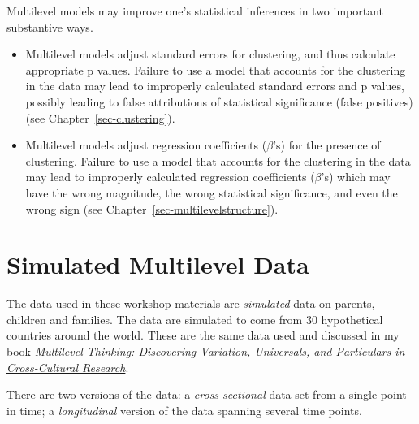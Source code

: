 \documentclass[
  letterpaper,
  DIV=11,
  numbers=noendperiod]{scrreprt}
\providecommand{\tightlist}{%
  \setlength{\itemsep}{0pt}\setlength{\parskip}{0pt}}
\begin{document}
\begin{tcolorbox}[enhanced jigsaw, arc=.35mm, bottomrule=.15mm, bottomtitle=1mm, breakable, colback=white, colbacktitle=quarto-callout-tip-color!10!white, colframe=quarto-callout-tip-color-frame, coltitle=black, left=2mm, leftrule=.75mm, opacityback=0, opacitybacktitle=0.6, rightrule=.15mm, title=\textcolor{quarto-callout-tip-color}{\faLightbulb}\hspace{0.5em}{The Importance of Multilevel Models}, titlerule=0mm, toprule=.15mm, toptitle=1mm]

Multilevel models may improve one's statistical inferences in two
important substantive ways.

\begin{itemize}
\tightlist
\item
  Multilevel models adjust standard errors for clustering, and thus
  calculate appropriate p values. Failure to use a model that accounts
  for the clustering in the data may lead to improperly calculated
  standard errors and p values, possibly leading to false attributions
  of statistical significance (false positives) (see
  Chapter~\ref{sec-clustering}).
\item
  Multilevel models adjust regression coefficients (\(\beta\)'s) for the
  presence of clustering. Failure to use a model that accounts for the
  clustering in the data may lead to improperly calculated regression
  coefficients (\(\beta\)'s) which may have the wrong magnitude, the
  wrong statistical significance, and even the wrong sign (see
  Chapter~\ref{sec-multilevelstructure}).
\end{itemize}

\end{tcolorbox}

\section{Simulated Multilevel Data}\label{simulated-multilevel-data}

The data used in these workshop materials are \emph{simulated} data on
parents, children and families. The data are simulated to come from 30
hypothetical countries around the world. These are the same data used
and discussed in my book
\emph{\href{https://academic.oup.com/book/60530}{Multilevel Thinking:
Discovering Variation, Universals, and Particulars in Cross-Cultural
Research}}.

There are two versions of the data: a \emph{cross-sectional} data set
from a single point in time; a \emph{longitudinal} version of the data
spanning several time points.
\end{document}
